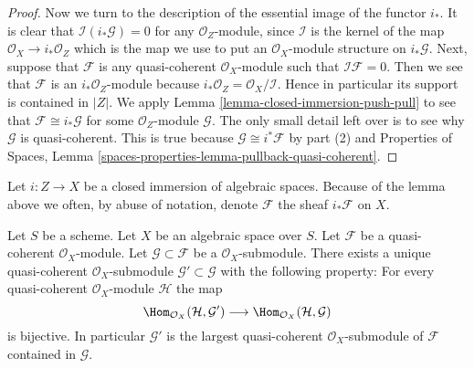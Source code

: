 \begin{proof}
\medskip\noindent
Now we turn to the description of the essential image of the
functor $i_*$. It is clear that $\mathcal{I}(i_*\mathcal{G}) = 0$
for any $\mathcal{O}_Z$-module, since $\mathcal{I}$ is the kernel
of the map $\mathcal{O}_X \to i_*\mathcal{O}_Z$ which is the map
we use to put an $\mathcal{O}_X$-module structure on $i_*\mathcal{G}$.
Next, suppose that $\mathcal{F}$ is any quasi-coherent
$\mathcal{O}_X$-module such that $\mathcal{I}\mathcal{F} = 0$.
Then we see that $\mathcal{F}$ is an $i_*\mathcal{O}_Z$-module
because $i_*\mathcal{O}_Z = \mathcal{O}_X/\mathcal{I}$. Hence in
particular its support is contained in $|Z|$. We apply
Lemma \ref{lemma-closed-immersion-push-pull}
to see that $\mathcal{F} \cong i_*\mathcal{G}$ for some
$\mathcal{O}_Z$-module $\mathcal{G}$. The only small detail left over
is to see why $\mathcal{G}$ is quasi-coherent. This is true
because $\mathcal{G} \cong i^*\mathcal{F}$ by part (2) and
Properties of Spaces,
Lemma \ref{spaces-properties-lemma-pullback-quasi-coherent}.
\end{proof}

\noindent
Let $i : Z \to X$ be a closed immersion of algebraic spaces.
Because of the lemma above we often,
by abuse of notation, denote $\mathcal{F}$ the sheaf $i_*\mathcal{F}$ on $X$.

\begin{lemma}
\label{lemma-largest-quasi-coherent-subsheaf}
Let $S$ be a scheme. Let $X$ be an algebraic space over $S$.
Let $\mathcal{F}$ be a quasi-coherent $\mathcal{O}_X$-module.
Let $\mathcal{G} \subset \mathcal{F}$ be a $\mathcal{O}_X$-submodule.
There exists a unique quasi-coherent $\mathcal{O}_X$-submodule
$\mathcal{G}' \subset \mathcal{G}$ with the following property:
For every quasi-coherent $\mathcal{O}_X$-module $\mathcal{H}$ the map
$$
\Hom_{\mathcal{O}_X}(\mathcal{H}, \mathcal{G}')
\longrightarrow
\Hom_{\mathcal{O}_X}(\mathcal{H}, \mathcal{G})
$$
is bijective. In particular $\mathcal{G}'$ is the largest quasi-coherent
$\mathcal{O}_X$-submodule of $\mathcal{F}$ contained in $\mathcal{G}$.
\end{lemma}

